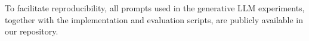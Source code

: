 \documentclass[conference,compsoc]{IEEEtran}
\begin{document}
To facilitate reproducibility, all prompts used in
the generative LLM experiments, together with the
implementation and evaluation scripts, are publicly
available in our repository.








\end{document}
